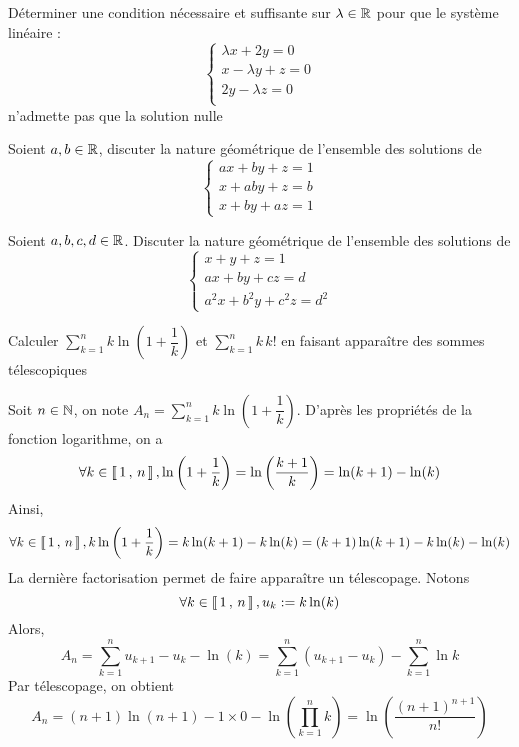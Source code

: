 \documentclass{fancybook}
\begin{document}
\begin{exercice}
Déterminer une condition nécessaire et suffisante sur $\lambda\in\mathbb{R}$ pour que le système linéaire :
\[\left\{\begin{array}{l}
\lambda x+2y=0\\
x-\lambda y+z=0\\
2y-\lambda z=0\\
\end{array}\right.
\]
n'admette pas que la solution nulle
\end{exercice}

\begin{exercice}
Soient $a, b \in\mathbb{R}$, discuter la nature géométrique de l'ensemble des solutions de 
\[
\left\{\begin{array}{l}
ax+by+z=1\\
x+aby+z=b\\
x+by+az=1
\end{array}\right.
\]
\end{exercice}

\begin{exercice}
Soient $a,b,c,d\in\mathbb{R}$. Discuter la nature géométrique de l'ensemble des solutions de 
\[
\left\{\begin{array}{l}
x+y+z=1\\
ax+by+cz=d\\
a^2 x+b^2 y+c^2 z=d^2
\end{array}\right.
\]
\end{exercice}


\begin{exercice}
Calculer $\displaystyle\sum\limits_{k=1}^{n} k \ln\left(1+\dfrac{1}{k}\right)$ et $\displaystyle\sum\limits_{k=1}^{n}k \, k!$ en faisant apparaître des sommes télescopiques 
\end{exercice}

\begin{solution}
Soit $n \in \mathbb{N}$, on note $A_n = \displaystyle\sum\limits_{k=1}^{n} k \ln\left(1+\dfrac{1}{k}\right)$. D'après les propriétés de la fonction logarithme, on a 
\[
\forall k \in \left\llbracket \, 1 \, , \, n \, \right\rrbracket, 
\ln\left(1+\dfrac{1}{k}\right)
= \ln\left(\dfrac{k+ 1}{k}\right) 
= \ln(k+1) - \ln(k) 
\]
Ainsi, 
\[
\forall k \in \left\llbracket \, 1 \, , \, n \, \right\rrbracket, 
k  \ln\left(1+\dfrac{1}{k}\right)
= k  \ln(k+1) - k \ln(k) 
= (k + 1)  \ln(k+1) - k \ln(k) - \ln(k)
\]
La dernière factorisation permet de faire apparaître un télescopage. Notons
\[
\forall k \in \left\llbracket \, 1 \, , \, n \, \right\rrbracket, u_k :=  k \ln(k)
\]
Alors, 
\[
A_n 
= \displaystyle\sum\limits_{k=1}^{n} u_{k+1} - u_{k} - \ln(k) =  \displaystyle\sum\limits_{k=1}^{n} (u_{k+1} - u_{k}) - \displaystyle\sum\limits_{k=1}^{n}\ln{k}
\]
Par télescopage, on obtient 
\[
A_n = (n+1)\ln(n+1) - 1 \times 0 - \ln\left(\displaystyle\prod\limits_{k=1}^{n} k\right) = \ln\left(\dfrac{(n+1)^{n+1}}{n!}\right)
\]
\end{solution}
\end{document}
